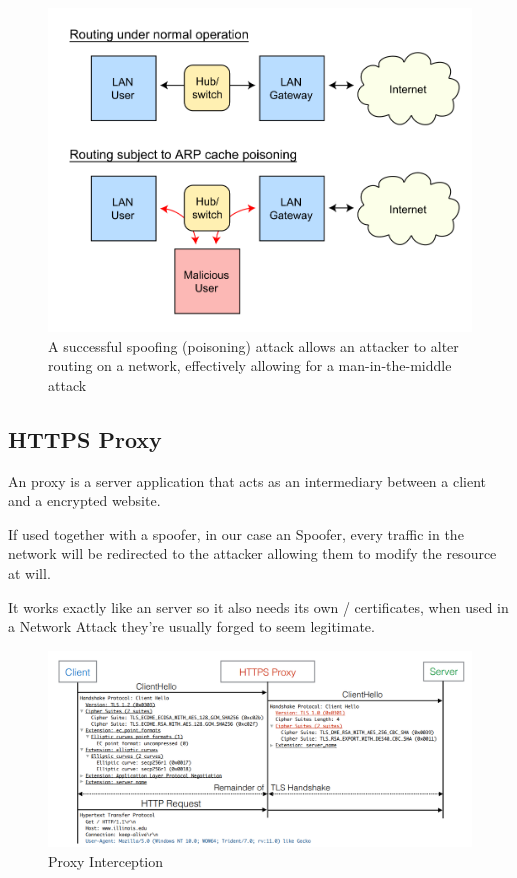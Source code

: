\begin{figure}[h!]
 \centering
 \includegraphics[width=13cm]{img/ARP_Spoofing.png}
 \caption{A successful  spoofing (poisoning) attack allows an attacker to alter routing on a network, effectively allowing for a man-in-the-middle attack\cite{arp-spoofing}}
 \label{fig: ARP Spoofing}
\end{figure}

\newpage

\subsection{HTTPS Proxy}

An  proxy is a server application that acts as an intermediary between a client and a  encrypted website.

If used together with a spoofer, in our case an  Spoofer, every  traffic in the network will be redirected to the attacker allowing them to modify the resource at will.

It works exactly like an  server so it also needs its own / certificates, when used in a Network Attack they're usually forged to seem legitimate.

\begin{figure}[h!]
 \centering
 \includegraphics[width=13cm]{img/https_proxy_interception.png}
 \caption{ Proxy Interception\protect\cite{https-interception}}
 \label{fig: HTTPS Proxy Interception}
\end{figure}


